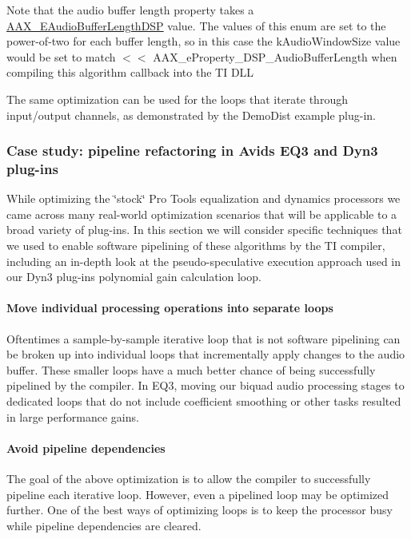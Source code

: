 Note that the audio buffer length property takes a \hyperlink{a00206_ab33e0f1ecf04ca4161fa8d8de5845d67}{A\+A\+X\+\_\+\+E\+Audio\+Buffer\+Length\+D\+S\+P} value. The values of this enum are set to the power-\/of-\/two for each buffer length, so in this case the {\ttfamily k\+Audio\+Window\+Size} value would be set to match { $<$$<$ A\+A\+X\+\_\+e\+Property\+\_\+\+D\+S\+P\+\_\+\+Audio\+Buffer\+Length} when compiling this algorithm callback into the T\+I D\+L\+L

The same optimization can be used for the loops that iterate through input/output channels, as demonstrated by the Demo\+Dist example plug-\/in.

\hypertarget{a00362_subsection__case_study_pipeline_refactoring_in_avids_eq3_and_dyn3_plugins}{}\subsubsection{Case study\+: pipeline refactoring in Avid\textquotesingle{}s E\+Q3 and Dyn3 plug-\/ins}\label{a00362_subsection__case_study_pipeline_refactoring_in_avids_eq3_and_dyn3_plugins}
 While optimizing the \char`\"{}stock\char`\"{} Pro Tools equalization and dynamics processors we came across many real-\/world optimization scenarios that will be applicable to a broad variety of plug-\/ins. In this section we will consider specific techniques that we used to enable software pipelining of these algorithms by the T\+I compiler, including an in-\/depth look at the pseudo-\/speculative execution approach used in our Dyn3 plug-\/in\textquotesingle{}s polynomial gain calculation loop.

\hypertarget{a00362_subsubsection__move_individual_processing_operations_into_separate_loops_}{}\paragraph{Move individual processing operations into separate loops}\label{a00362_subsubsection__move_individual_processing_operations_into_separate_loops_}
 Oftentimes a sample-\/by-\/sample iterative loop that is not software pipelining can be broken up into individual loops that incrementally apply changes to the audio buffer. These smaller loops have a much better chance of being successfully pipelined by the compiler. In E\+Q3, moving our biquad audio processing stages to dedicated loops that do not include coefficient smoothing or other tasks resulted in large performance gains.

\hypertarget{a00362_subsubsection__avoid_pipeline_dependencies_}{}\paragraph{Avoid pipeline dependencies}\label{a00362_subsubsection__avoid_pipeline_dependencies_}
 The goal of the above optimization is to allow the compiler to successfully pipeline each iterative loop. However, even a pipelined loop may be optimized further. One of the best ways of optimizing loops is to keep the processor busy while pipeline dependencies are cleared.

